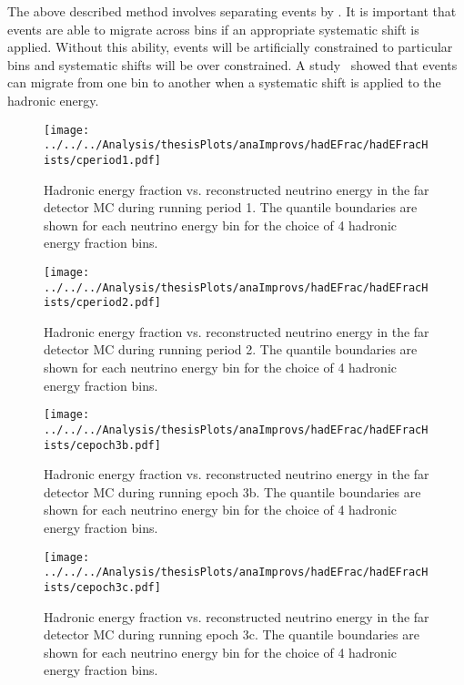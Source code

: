 The above described method involves separating events by \hadefrac{}.
It is important that events are able to migrate across \hadefrac{}
bins if an appropriate systematic shift is applied. 
Without this ability, events will be artificially constrained to
particular \hadefrac{} bins and systematic shifts will be over
constrained.
A study~\cite{hadEFracMigration} showed that events can migrate from one
\hadefrac{} bin to another when a systematic shift is applied to the hadronic
energy.


\begin{figure}
  \centering
  \texttt{[image: ../../../Analysis/thesisPlots/anaImprovs/hadEFrac/hadEFracHists/cperiod1.pdf]}
  \caption{Hadronic energy fraction vs. reconstructed neutrino
    energy in the far detector MC during running period 1. The
    quantile boundaries are shown for each neutrino energy bin for
    the choice of 4 hadronic energy fraction bins. } 
  \label{fig:hadEFracHistP1}
\end{figure}
\begin{figure}
  \centering
  \texttt{[image: ../../../Analysis/thesisPlots/anaImprovs/hadEFrac/hadEFracHists/cperiod2.pdf]}
  \caption{Hadronic energy fraction vs. reconstructed neutrino
    energy in the far detector MC during running period 2. 
    The quantile boundaries are shown for each neutrino energy bin
    for the choice of 4 hadronic energy fraction bins.
  } 
  \label{fig:hadEFracHistP2}
\end{figure}
\begin{figure}
  \centering
  \texttt{[image: ../../../Analysis/thesisPlots/anaImprovs/hadEFrac/hadEFracHists/cepoch3b.pdf]}
  \caption{Hadronic energy fraction vs. reconstructed neutrino
    energy in the far detector MC during running epoch 3b.
    The quantile boundaries are shown for each neutrino energy bin
    for the choice of 4 hadronic energy fraction bins.  } 
  \label{fig:hadEFracHistE3b}
\end{figure}
\begin{figure}
  \centering
  \texttt{[image: ../../../Analysis/thesisPlots/anaImprovs/hadEFrac/hadEFracHists/cepoch3c.pdf]}
  \caption{Hadronic energy fraction vs. reconstructed neutrino
    energy in the far detector MC during running epoch 3c. 
    The quantile boundaries are shown for each neutrino energy bin
    for the choice of 4 hadronic energy fraction bins.  } 
  \label{fig:hadEFracHistE3c}
\end{figure}



